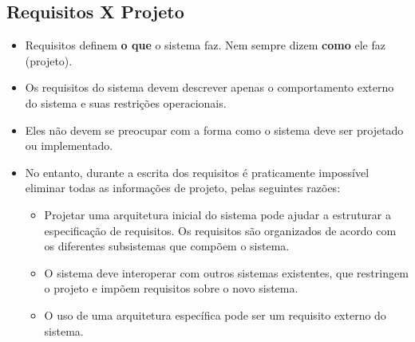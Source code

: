 \documentclass[a4paper, 11pt]{article}
\begin{document}
\subsection{Requisitos \textbf{X} Projeto}
\begin{itemize}
	\item Requisitos definem \textbf{o que} o sistema faz. Nem sempre dizem \textbf{como} ele faz (projeto).
	\item Os requisitos do sistema devem descrever apenas o comportamento externo do sistema e suas restrições operacionais.
	\item Eles não devem se preocupar com a forma como o sistema deve ser projetado ou implementado.
	\item No entanto, durante a escrita dos requisitos é praticamente impossível eliminar todas as informações de projeto, pelas seguintes razões:
	\begin{itemize}
		\item Projetar uma arquitetura inicial do sistema pode ajudar a estruturar a especificação de requisitos. Os requisitos são organizados de acordo com 
		os diferentes subsistemas que compõem o sistema.
		\item O sistema deve interoperar com outros sistemas existentes, que restringem o projeto e impõem requisitos sobre o novo sistema.
		\item O uso de uma arquitetura específica pode ser um requisito externo do sistema.
	\end{itemize}
\end{itemize}
\end{document}
